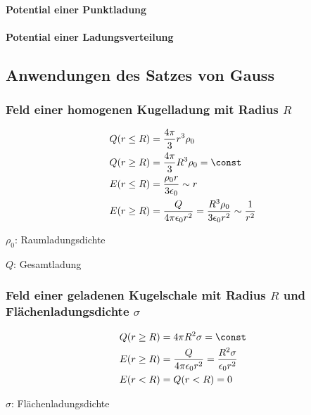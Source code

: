 		\paragraph{Potential einer Punktladung} %
		
		\paragraph{Potential einer Ladungsverteilung} %
	\subsection{Anwendungen des Satzes von Gauss} %
		\subsubsection{Feld einer homogenen Kugelladung mit Radius $R$} %
			\begin{align*}
				Q(r \leq R) &= \frac{4\pi}{3}r^3 \rho_0 \\
				Q(r \geq R) &= \frac{4\pi}{3}R^3 \rho_0 = \const\\
				E(r \leq R) &= \frac{\rho_0 r}{3 \epsilon_0} \sim r \\
				E(r \geq R) &= \frac{Q}{4\pi\epsilon_0 r^2} = \frac{R^3\rho_0}{3 \epsilon_0 r^2} \sim \frac{1}{r^2}
			\end{align*}
			\begin{tightitemize}
				\item[$\rho_0$:] Raumladungsdichte \niceunit{\coulomb\per\cubic\metre}
				\item[$Q$:] Gesamtladung
			\end{tightitemize}
		\subsubsection{Feld einer geladenen Kugelschale mit Radius $R$ und Flächenladungsdichte $\sigma$} %
			\begin{align*}
				Q(r \geq R) &= 4\pi R^2 \sigma = \const \\
				E(r \geq R) &= \frac{Q}{4\pi\epsilon_0 r^2} = \frac{R^2 \sigma}{\epsilon_0 r^2} \\
				E(r < R) &= Q(r < R) = 0
			\end{align*}
			\begin{tightitemize}
				\item[$\sigma$:] Flächenladungsdichte \niceunit{\coulomb\per\Square\metre}
			\end{tightitemize}
